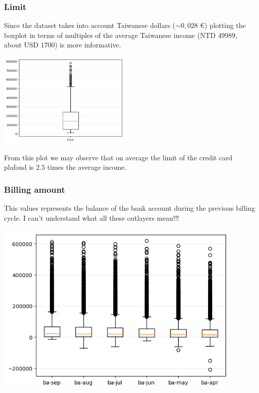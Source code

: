 \documentclass[a4paper]{article}
\begin{document}
\subsubsection{Limit}
Since the dataset takes into account Taiwanese dollars ($\sim 0,028$ €) plotting the boxplot in terms of multiples of the average Taiwanese income (NTD $49989$, about USD $1700$) is more informative.
\begin{center}
\includegraphics[width=0.48\textwidth]{../Code/boxPlotsGemma/boxplots/limit.png}

\end{center}
From this plot we may observe that on average the limit of the credit card plafond is $2.5$ times the average income.
\subsubsection{Billing amount}
This values represents the balance of the bank account during the previous billing cycle.
I can't understand what all these outlayers mean!!!
\begin{center}
\includegraphics[width=0.9\textwidth]{../Code/boxPlotsGemma/boxplots/ba.png}
\end{center}
\end{document}
